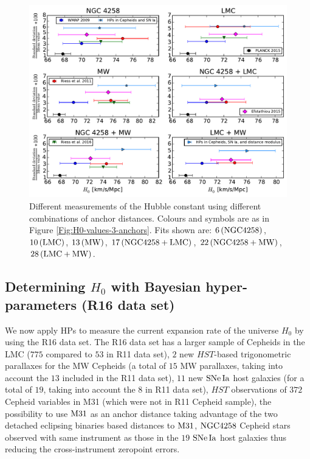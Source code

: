 \begin{figure}[hbtp]
\centering
\includegraphics[scale=.75]{figures/chapter-h0/H0_values_anchor_combination.pdf}
\caption{Different measurements of the Hubble constant using different combinations of anchor distances. Colours and symbols are as in Figure \ref{Fig:H0-values-3-anchors}. Fits shown are: $6\,(\mathrm{NGC4258})$, $10\,(\mathrm{LMC})$, $13\,(\mathrm{MW})$, $17\,(\mathrm{NGC4258}+\mathrm{LMC})$, $22\,(\mathrm{NGC4258}+\mathrm{MW})$, $28\,(\mathrm{LMC}+\mathrm{MW})$.}
\label{Fig:single-combined-anchor}
\end{figure}

\subsection{Determining $H_0$ with Bayesian hyper-parameters (R16 data set)}
\label{Subsection:combining-anchors-R16}

We now apply HPs to measure the current expansion rate of the universe $H_0$ by using the R16 data set. The R16 data set has a larger sample of Cepheids in the LMC ($775$ compared to $53$ in R11 data set), $2$ new $\mathit{HST}$-based trigonometric parallaxes for the MW Cepheids (a total of $15$ MW parallaxes, taking into account the $13$ included in the R11 data set), $11$ new $\mathrm{SNe\,Ia}$ host galaxies (for a total of $19$, taking into account the $8$ in R11 data set), $\mathit{HST}$ observations of $372$ Cepheid variables in M31 (which were not in R11 Cepheid sample), the possibility to use $\mathrm{M31}$ as an anchor distance taking advantage of the two detached eclipsing binaries based distances to $\mathrm{M31}$, $\mathrm{NGC4258}$ Cepheid stars observed with same instrument as those in the $19$ $\mathrm{SNe\,Ia}$ host galaxies thus reducing the cross-instrument zeropoint errors.   

